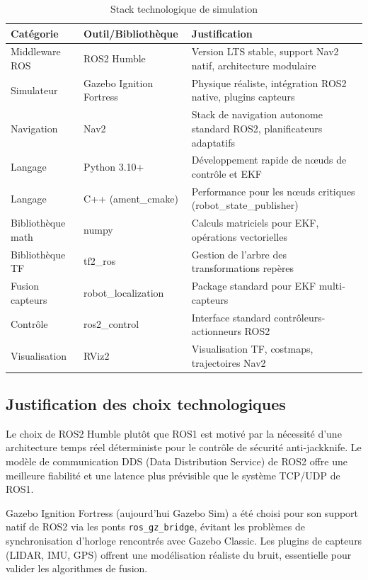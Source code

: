 \documentclass[a4paper,12pt]{report}
\begin{document}
\begin{table}[htbp]
    \centering
    \begin{tabular}{llp{6cm}}
        \toprule
        Catégorie & Outil/Bibliothèque & Justification \\
        \midrule
        Middleware ROS & ROS2 Humble & Version LTS stable, support Nav2 natif, architecture modulaire \\
        Simulateur & Gazebo Ignition Fortress & Physique réaliste, intégration ROS2 native, plugins capteurs \\
        Navigation & Nav2 & Stack de navigation autonome standard ROS2, planificateurs adaptatifs \\
        Langage & Python 3.10+ & Développement rapide de nœuds de contrôle et EKF \\
        Langage & C++ (ament\_cmake) & Performance pour les nœuds critiques (robot\_state\_publisher) \\
        Bibliothèque math & numpy & Calculs matriciels pour EKF, opérations vectorielles \\
        Bibliothèque TF & tf2\_ros & Gestion de l'arbre des transformations repères \\
        Fusion capteurs & robot\_localization & Package standard pour EKF multi-capteurs \\
        Contrôle & ros2\_control & Interface standard contrôleurs-actionneurs ROS2 \\
        Visualisation & RViz2 & Visualisation TF, costmaps, trajectoires Nav2 \\
        \bottomrule
    \end{tabular}
    \caption{Stack technologique de simulation}
    \label{tab:stack_simulation}
\end{table}

\subsection{Justification des choix technologiques}
\label{subsec:justification_choix}

Le choix de ROS2 Humble plutôt que ROS1 est motivé par la nécessité d'une architecture temps réel déterministe pour le contrôle de sécurité anti-jackknife. Le modèle de communication DDS (Data Distribution Service) de ROS2 offre une meilleure fiabilité et une latence plus prévisible que le système TCP/UDP de ROS1.

Gazebo Ignition Fortress (aujourd'hui Gazebo Sim) a été choisi pour son support natif de ROS2 via les ponts \texttt{ros\_gz\_bridge}, évitant les problèmes de synchronisation d'horloge rencontrés avec Gazebo Classic. Les plugins de capteurs (LIDAR, IMU, GPS) offrent une modélisation réaliste du bruit, essentielle pour valider les algorithmes de fusion.
\end{document}
